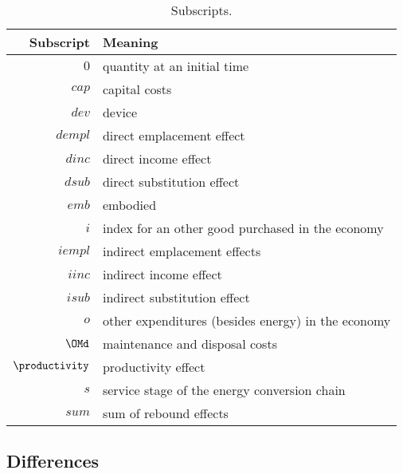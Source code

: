 
\begin{table}
\centering
\caption{Subscripts.}
\begin{tabular}{r l}
  \toprule
  Subscript & Meaning \\
  \midrule
  $0$ & quantity at an initial time \\
  $cap$ & capital costs \\
  $dev$ & device \\
  $dempl$ & direct emplacement effect \\
  $dinc$ & direct income effect \\
  $dsub$ & direct substitution effect \\
  $emb$ & embodied \\
  $i$ & index for an other good purchased in the economy \\
  $iempl$ & indirect emplacement effects \\
  $iinc$ & indirect income effect \\
  $isub$ & indirect substitution effect \\
  $o$ & other expenditures (besides energy) in the economy \\
  $\OMd$ & maintenance and disposal costs \\
  $\productivity$ & productivity effect \\
  $s$ & service stage of the energy conversion chain \\
  $sum$ & sum of rebound effects \\
  \bottomrule
\end{tabular}
\label{tab:subscripts}
\end{table}


\subsection{Differences}
\label{sec:differences}

